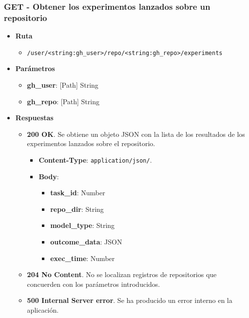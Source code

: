 \subsubsection{GET - Obtener los experimentos lanzados sobre un repositorio}

\begin{itemize}
    \item[] \textbf{Ruta}
        \begin{itemize} \setlength\itemsep{0.2em}
            \item[] \texttt{/user/<string:gh\_user>/repo/<string:gh\_repo>/experiments}
        \end{itemize}
    \item[] \textbf{Parámetros}
        \begin{itemize} \setlength\itemsep{0.2em}
            \item[] \textbf{gh\_user}: [Path] String
            \item[] \textbf{gh\_repo}: [Path] String
        \end{itemize}
    \item[] \textbf{Respuestas}
        \begin{itemize} \setlength\itemsep{0.2em}
            \item[] \textbf{200 OK}. Se obtiene un objeto JSON con la lista de los resultados de los experimentos lanzados sobre el repositorio.
                \begin{itemize} \setlength\itemsep{0.2em}
                    \item[] \textbf{Content-Type}: \texttt{application/json/}.
                    \item[] \textbf{Body}: 
                        \begin{itemize} \setlength\itemsep{0.2em}
                            \item[] \textbf{task\_id}: Number
                            \item[] \textbf{repo\_dir}: String
                            \item[] \textbf{model\_type}: String
                            \item[] \textbf{outcome\_data}: JSON
                            \item[] \textbf{exec\_time}: Number
                        \end{itemize}
                \end{itemize}
            \item[] \textbf{204 No Content}. No se localizan registros de repositorios que concuerden con los parámetros introducidos.
            \item[] \textbf{500 Internal Server error}. Se ha producido un error interno en la aplicación.
        \end{itemize}
\end{itemize}

